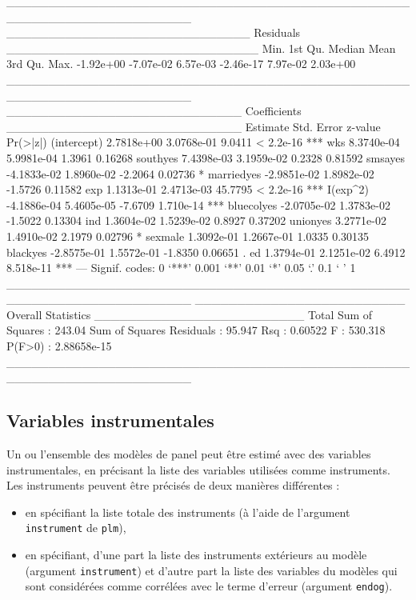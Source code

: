 \documentclass[a4paper]{article}
\begin{document}
\begin{Schunk}
\begin{Soutput}
______________________________________________________________________ 
_____________________________ Residuals ______________________________
     Min.   1st Qu.    Median      Mean   3rd Qu.      Max. 
-1.92e+00 -7.07e-02  6.57e-03 -2.46e-17  7.97e-02  2.03e+00 
______________________________________________________________________ 
____________________________ Coefficients ____________________________
               Estimate  Std. Error z-value  Pr(>|z|)    
(intercept)  2.7818e+00  3.0768e-01  9.0411 < 2.2e-16 ***
wks          8.3740e-04  5.9981e-04  1.3961   0.16268    
southyes     7.4398e-03  3.1959e-02  0.2328   0.81592    
smsayes     -4.1833e-02  1.8960e-02 -2.2064   0.02736 *  
marriedyes  -2.9851e-02  1.8982e-02 -1.5726   0.11582    
exp          1.1313e-01  2.4713e-03 45.7795 < 2.2e-16 ***
I(exp^2)    -4.1886e-04  5.4605e-05 -7.6709 1.710e-14 ***
bluecolyes  -2.0705e-02  1.3783e-02 -1.5022   0.13304    
ind          1.3604e-02  1.5239e-02  0.8927   0.37202    
unionyes     3.2771e-02  1.4910e-02  2.1979   0.02796 *  
sexmale      1.3092e-01  1.2667e-01  1.0335   0.30135    
blackyes    -2.8575e-01  1.5572e-01 -1.8350   0.06651 .  
ed           1.3794e-01  2.1251e-02  6.4912 8.518e-11 ***
---
Signif. codes:  0 ‘***’ 0.001 ‘**’ 0.01 ‘*’ 0.05 ‘.’ 0.1 ‘ ’ 1 
______________________________________________________________________ 
_________________________ Overall Statistics _________________________
Total Sum of Squares       : 243.04
Sum of Squares Residuals   : 95.947
Rsq                        : 0.60522
F                          : 530.318
P(F>0)                     : 2.88658e-15
______________________________________________________________________ 
\end{Soutput}
\end{Schunk}

\subsection{Variables instrumentales}

Un ou l'ensemble des modèles de panel peut être estimé avec des
variables instrumentales, en précisant la liste des variables
utilisées comme instruments. Les instruments peuvent être précisés de
deux manières différentes :

\begin{itemize}
\item en spécifiant la liste totale des instruments (à l'aide de
  l'argument \texttt{instrument} de \texttt{plm}),
\item en spécifiant, d'une part la liste des instruments extérieurs
  au modèle (argument \texttt{instrument}) et d'autre part la liste des variables du modèles qui sont
  considérées comme corrélées avec le terme d'erreur (argument \texttt{endog}).
\end{itemize}
\end{document}
